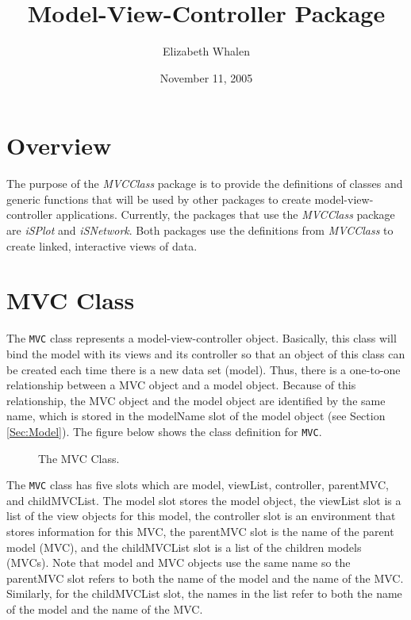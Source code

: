 \documentclass[11pt]{article}
\title{Model-View-Controller Package}
\author{Elizabeth Whalen}
\date{November 11, 2005}
\newcommand{\Robject}[1]{{\texttt{#1}}}
\newcommand{\Rpackage}[1]{{\textit{#1}}}
\begin{document}
\maketitle

\section{Overview}\label{Sec:Overview}

The purpose of the \Rpackage{MVCClass} package is to provide the definitions of
classes and generic functions that will be used by other packages to create 
model-view-controller applications.  Currently, the packages that use the 
\Rpackage{MVCClass} package are \Rpackage{iSPlot} and \Rpackage{iSNetwork}.  
Both packages use the definitions from \Rpackage{MVCClass} to create linked, 
interactive views of data.

\section{MVC Class}\label{Sec:MVC}

The \Robject{MVC} class represents a model-view-controller object.  Basically, 
this class will bind the model with its views and its controller so that 
an object of this class can be created each time there is a new data set 
(model).  Thus, there is a one-to-one relationship between a MVC object and
a model object.  Because of this relationship, the
MVC object and the model object are identified by the same name,
which is stored in the modelName slot of the model object (see Section 
\ref{Sec:Model}).  The figure below 
shows the class definition for \Robject{MVC}. 

\begin{figure}[ht]
  \begin{center}
    \caption{ The MVC Class. }
    \label{Fig:MVCClass}
  \end{center}
\end{figure}

The \Robject{MVC} class has five slots which are model, viewList, controller, 
parentMVC, and childMVCList.  The
model slot stores the model object, the viewList slot is a list of the view
objects for this model, the controller slot is an environment that stores
information for this MVC, the parentMVC slot is the name of the parent model
(MVC), and the childMVCList slot is a list of the children models
(MVCs).  Note that model and MVC objects use the same name so the
parentMVC slot refers to both the name of the model and the name of the
MVC.  Similarly, for the childMVCList slot, the names in the list
refer to both the name of the model and the name of the MVC.
\end{document}
